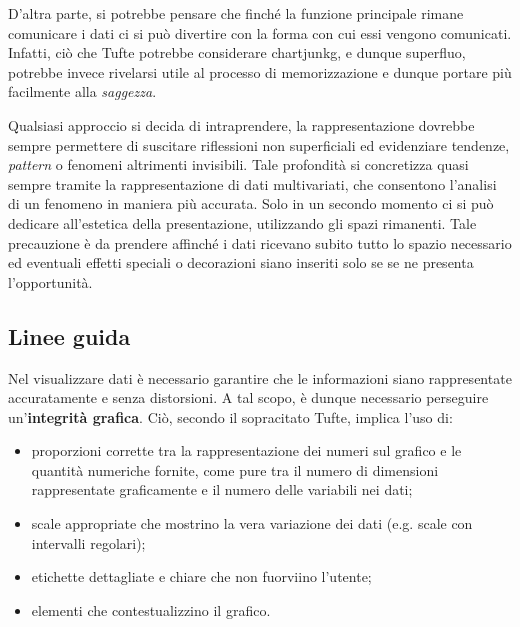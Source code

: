 D'altra parte, si potrebbe pensare che finché la funzione principale rimane comunicare i dati ci si può divertire con la forma con cui essi vengono comunicati. Infatti, ciò che Tufte potrebbe considerare \gls{chartjunkg}, e dunque superfluo,
potrebbe invece rivelarsi utile al processo di memorizzazione e dunque portare più facilmente alla \emph{saggezza}. 

Qualsiasi approccio si decida di intraprendere, la rappresentazione dovrebbe sempre permettere di suscitare riflessioni non superficiali ed evidenziare tendenze, \emph{pattern} 
o fenomeni altrimenti invisibili. Tale profondità si concretizza quasi sempre tramite la rappresentazione di dati multivariati, che consentono l'analisi di un fenomeno in maniera più accurata.
Solo in un secondo momento ci si può dedicare all'estetica della presentazione, utilizzando gli spazi rimanenti. Tale precauzione è da prendere affinché i dati ricevano subito tutto lo spazio necessario ed eventuali
effetti speciali o decorazioni siano inseriti solo se se ne presenta l'opportunità.


\subsection{Linee guida}
Nel visualizzare dati è necessario garantire che le informazioni siano rappresentate accuratamente e senza distorsioni.
A tal scopo, è dunque necessario perseguire un'\textbf{integrità grafica}. Ciò, secondo il sopracitato Tufte, implica l'uso di:
\begin{itemize}
    \item proporzioni corrette tra la rappresentazione dei numeri sul grafico e le quantità numeriche fornite, come pure tra il 
    numero di dimensioni rappresentate graficamente e il numero delle variabili nei dati;
    \item scale appropriate che mostrino la vera variazione dei dati (e.g. scale con intervalli regolari);
    \item etichette dettagliate e chiare che non fuorviino l'utente;
    \item elementi che contestualizzino il grafico.
\end{itemize}

